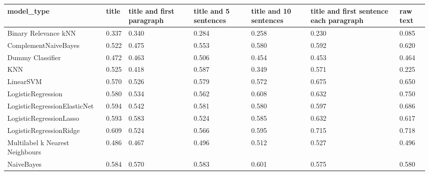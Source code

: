 \begin{tabular}{lllllll}
\toprule
                     model\_type & title & title and first paragraph & title and 5 sentences & title and 10 sentences & title and first sentence each paragraph &  raw text \\
\midrule
           Binary Relevance kNN & 0.337 &                     0.340 &                 0.284 &                  0.258 &                                   0.230 &     0.085 \\
           ComplementNaiveBayes & 0.522 &                     0.475 &                 0.553 &                  0.580 &                                   0.592 &     0.620 \\
               Dummy Classifier & 0.472 &                     0.463 &                 0.506 &                  0.454 &                                   0.453 &     0.464 \\
                            KNN & 0.525 &                     0.418 &                 0.587 &                  0.349 &                                   0.571 &     0.225 \\
                      LinearSVM & 0.570 &                     0.526 &                 0.579 &                  0.572 &                                   0.675 &     0.650 \\
             LogisticRegression & 0.580 &                     0.534 &                 0.562 &                  0.608 &                                   0.632 &     0.750 \\
   LogisticRegressionElasticNet & 0.594 &                     0.542 &                 0.581 &                  0.580 &                                   0.597 &     0.686 \\
        LogisticRegressionLasso & 0.593 &                     0.583 &                 0.524 &                  0.585 &                                   0.632 &     0.617 \\
        LogisticRegressionRidge & 0.609 &                     0.524 &                 0.566 &                  0.595 &                                   0.715 &     0.718 \\
Multilabel k Nearest Neighbours & 0.486 &                     0.467 &                 0.496 &                  0.512 &                                   0.527 &     0.496 \\
                     NaiveBayes & 0.584 &                     0.570 &                 0.583 &                  0.601 &                                   0.575 &     0.580 \\

\end{tabular}
